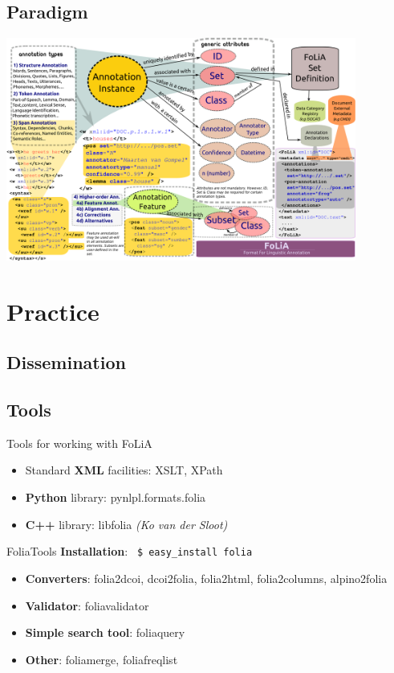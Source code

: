 \documentclass[compress]{beamer}
\begin{document}
\subsection{Paradigm}

\begin{frame}
        \includegraphics[width=115.0mm]{folia_paradigm.png}
\end{frame}

\section{Practice}
\subsection{Dissemination}

\subsection{Tools}

\begin{frame}
	\begin{block}{Tools for working with FoLiA}
		\begin{itemize}
			\item Standard \textbf{XML} facilities: XSLT, XPath
			\item \textbf{Python} library: pynlpl.formats.folia
			\item \textbf{C++} library: libfolia \emph{(Ko van der Sloot)}
		\end{itemize}
	\end{block}
	
	\begin{block}{FoliaTools}
		\textbf{Installation}: \texttt{ \$ easy\_install folia}
		\begin{itemize}
			\item \textbf{Converters}: folia2dcoi, dcoi2folia, folia2html, folia2columns, alpino2folia
			\item \textbf{Validator}: foliavalidator
			\item \textbf{Simple search tool}: foliaquery
			\item \textbf{Other}: foliamerge, foliafreqlist
		\end{itemize}
	\end{block}
\end{frame}
\end{document}
